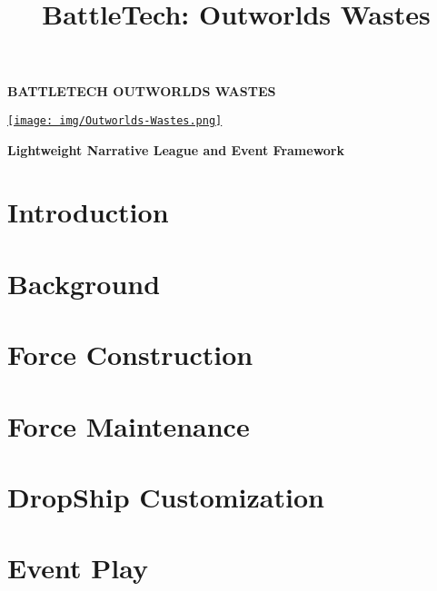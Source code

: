 \documentclass{article}
\title{BattleTech: Outworlds Wastes}
\author{}
\date{}
\newcommand{\mysectiontitle}{}
\newcommand{\newsection}[2]{\renewcommand{\mysectiontitle}{#2}\section{#1}}
\begin{document}
\makeatletter
{}

\begin{center}
  \fontsize{50}{60}\bfseries\selectfont\MakeUppercase{BattleTech}
  \fontsize{30}{37}\bfseries\selectfont\MakeUppercase{Outworlds Wastes}

  \href{https://ko-fi.com/bleptarts}{\texttt{[image: img/Outworlds-Wastes.png]}}

  \LARGE\bfseries{Lightweight Narrative League and Event Framework}
\end{center}

\newsection{Introduction}{introduction}



\newpage

\newsection{Background}{background}



\newsection{Force Construction}{force-construction}



\newpage

\newsection{Force Maintenance}{force-management}
\label{sec:force_management}



\newpage

\newsection{DropShip Customization}{dropship-customization}
\label{sec:dropship_customization}



\newpage

\newsection{Event Play}{event-play}
\label{sec:event_play}
\end{document}
